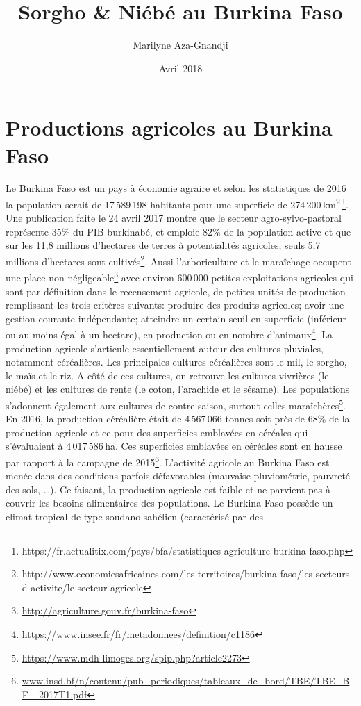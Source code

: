 \documentclass[a4paper,11pt]{article}
\begin{document}
\title{Sorgho \& Niébé au Burkina Faso}
\author{Marilyne Aza-Gnandji}
\date{Avril 2018} 

\maketitle
\tableofcontents

\section{Productions agricoles au Burkina Faso}

Le Burkina Faso est un pays à économie agraire\cite{Koulibi_FideleZONGO}
et selon les statistiques de 2016 la population serait de 17\,589\,198 habitants
pour une superficie de 274\,200\,km\textsuperscript{2}\,\footnote{https://fr.actualitix.com/pays/bfa/statistiques-agriculture-burkina-faso.php}. Une publication faite le 24 avril 2017 montre que le  secteur agro-sylvo-pastoral représente 35\% du PIB burkinabé, et emploie 82\% de la population active et que sur les 11,8 millions d'hectares de terres à potentialités agricoles, seuls 5,7 millions d’hectares sont cultivés\footnote{http://www.economiesafricaines.com/les-territoires/burkina-faso/les-secteurs-d-activite/le-secteur-agricole}. Aussi l'arboriculture et le maraîchage occupent une place
non négligeable\footnote{\url{http://agriculture.gouv.fr/burkina-faso}}
avec environ 600\,000 petites exploitations agricoles qui sont par
définition dans le recensement agricole, de petites unités de
production remplissant les trois critères suivants: produire des
produits agricoles; avoir une gestion courante indépendante; atteindre
un certain seuil en superficie (inférieur ou au moins égal à un
hectare), en production ou en nombre d’animaux\footnote{https://www.insee.fr/fr/metadonnees/definition/c1186}. La production agricole s’articule essentiellement autour des cultures pluviales, notamment céréalières. Les principales cultures céréalières sont le mil, le sorgho, le maïs et le riz. A côté de ces cultures, on retrouve les cultures vivrières (le niébé) et les cultures de rente (le coton, l’arachide et le sésame). Les populations s’adonnent également aux cultures de contre saison, surtout celles maraîchères\footnote{\url{https://www.mdh-limoges.org/spip.php?article2273}}.
En 2016, la production céréalière était de 4\,567\,066 tonnes  soit près
de 68\% de la production agricole et ce pour des superficies emblavées en céréales
qui s'évaluaient à 4\,017\,586\,ha. Ces superficies emblavées en céréales sont en hausse par rapport à la campagne de 2015\footnote{\url{www.insd.bf/n/contenu/pub_periodiques/tableaux_de_bord/TBE/TBE_BF_ 2017T1.pdf}}. L’activité agricole au Burkina Faso est menée dans des conditions parfois défavorables (mauvaise pluviométrie, pauvreté des sols, \ldots{}). Ce faisant, la production agricole est faible et ne parvient pas à couvrir les besoins alimentaires des populations. Le Burkina Faso possède un climat tropical de type soudano-sahélien (caractérisé par des
\end{document}
